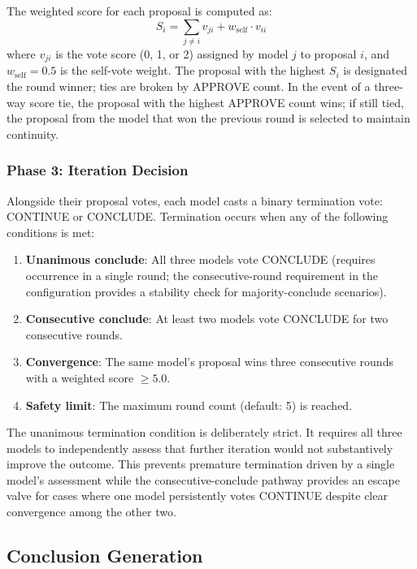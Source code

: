 \documentclass[11pt,a4paper]{article}
\begin{document}
The weighted score for each proposal is computed as:
\begin{equation}
    S_i = \sum_{j \neq i} v_{ji} + w_{\text{self}} \cdot v_{ii}
    \label{eq:score}
\end{equation}
where $v_{ji}$ is the vote score (0, 1, or 2) assigned by model $j$ to proposal $i$, and $w_{\text{self}} = 0.5$ is the self-vote weight. The proposal with the highest $S_i$ is designated the round winner; ties are broken by APPROVE count. In the event of a three-way score tie, the proposal with the highest APPROVE count wins; if still tied, the proposal from the model that won the previous round is selected to maintain continuity.

\subsubsection{Phase 3: Iteration Decision}

Alongside their proposal votes, each model casts a binary termination vote: CONTINUE or CONCLUDE. Termination occurs when any of the following conditions is met:

\begin{enumerate}[nosep]
    \item \textbf{Unanimous conclude}: All three models vote CONCLUDE (requires occurrence in a single round; the consecutive-round requirement in the configuration provides a stability check for majority-conclude scenarios).
    \item \textbf{Consecutive conclude}: At least two models vote CONCLUDE for two consecutive rounds.
    \item \textbf{Convergence}: The same model's proposal wins three consecutive rounds with a weighted score $\geq 5.0$.
    \item \textbf{Safety limit}: The maximum round count (default: 5) is reached.
\end{enumerate}

The unanimous termination condition is deliberately strict. It requires all three models to independently assess that further iteration would not substantively improve the outcome. This prevents premature termination driven by a single model's assessment while the consecutive-conclude pathway provides an escape valve for cases where one model persistently votes CONTINUE despite clear convergence among the other two.

\subsection{Conclusion Generation}
\label{sec:conclusion_generation}
\end{document}
